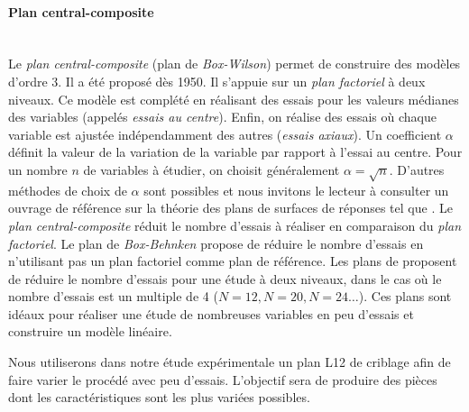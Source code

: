 \paragraph{Plan central-composite}\mbox{\label{parag:doe_cc}} \\
Le \textit{plan central-composite} (plan de \textit{Box-Wilson}) permet de construire des modèles d'ordre 3.
Il a été proposé dès 1950.
Il s'appuie sur un \textit{plan factoriel} à deux niveaux.
Ce modèle est complété en réalisant des essais pour les valeurs médianes des variables (appelés \textit{essais au centre}).
Enfin, on réalise des essais où chaque variable est ajustée indépendamment des autres (\textit{essais axiaux}).
Un coefficient $\alpha$ définit la valeur de la variation de la variable par rapport à l'essai au centre.
Pour un nombre $n$ de variables à étudier, on choisit généralement $\alpha = \sqrt{n}$.
D'autres méthodes de choix de $\alpha$ sont possibles et nous invitons le lecteur à consulter un ouvrage de référence sur la théorie des plans de surfaces de réponses tel que  \cite{myers_response_1971}.
Le \textit{plan central-composite} réduit le nombre d'essais à réaliser en comparaison du \textit{plan factoriel}.
Le plan de \textit{Box-Behnken} propose de réduire le nombre d'essais en n'utilisant pas un plan factoriel comme plan de référence.
Les plans de \citeauthor{plackett_design_1946} \cite{plackett_design_1946} proposent de réduire le nombre d'essais pour une étude à deux niveaux, dans le cas où le nombre d'essais est un multiple de 4 ($N=12, N=20, N=24 \dots$).
Ces plans sont idéaux pour réaliser une étude de nombreuses variables en peu d'essais et construire un modèle linéaire.

Nous utiliserons dans notre étude expérimentale un plan L12 de criblage afin de faire varier le procédé avec peu d'essais.
L'objectif sera de produire des pièces dont les caractéristiques sont les plus variées possibles.

\vspace{1cm}

